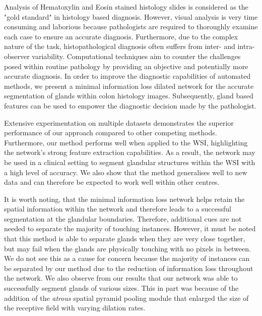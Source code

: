 \documentclass[3p]{elsarticle}
\begin{document}
Analysis of Hematoxylin and Eosin stained histology slides is considered as the "gold standard" in histology based diagnosis. However, visual analysis is very time consuming and laborious because pathologists are required to thoroughly examine each case to ensure an accurate diagnosis. Furthermore, due to the complex nature of the task, histopathological diagnosis often suffers from inter- and intra-observer variability. Computational techniques aim to counter the challenges posed within routine pathology by providing an objective and potentially more accurate diagnosis. In order to improve the diagnostic capabilities of automated methods, we present a minimal information loss dilated network for the accurate segmentation of glands within colon histology images. Subsequently, gland based features can be used to empower the diagnostic decision made by the pathologist. 

Extensive experimentation on multiple datasets demonstrates the superior performance of our approach compared to other competing methods. Furthermore, our method performs well when applied to the WSI, highlighting the network's strong feature extraction capabilities. As a result, the network may be used in a clinical setting to segment glandular structures within the WSI with a high level of accuracy. We also show that the method generalises well to new data and can therefore be expected to work well within other centres. 

It is worth noting, that the minimal information loss network helps retain the spatial information within the network and therefore leads to a successful segmentation at the glandular boundaries. Therefore, additional cues are not needed to separate the majority of touching instances. However, it must be noted that this method is able to separate glands when they are very close together, but may fail when the glands are physically touching with no pixels in between. We do not see this as a cause for concern because the majority of instances can be separated by our method due to the reduction of information loss throughout the network. We also observe from our results that our network was able to successfully segment glands of various sizes. This in part was because of the addition of the \textit{atrous} spatial pyramid pooling module that enlarged the size of the receptive field with varying dilation rates.
\end{document}

